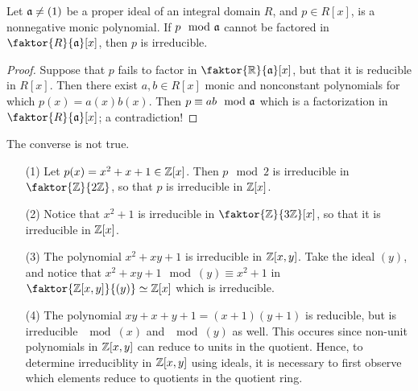 \begin{lemma}\label{lemma_7.3.3}
    Let $\mathfrak{a} \neq (1)$ be a proper ideal of an integral domain $R$, and  $p \in
    R[x]$, is a nonnegative monic polynomial. If $p \mod{\mathfrak{a}}$ cannot be factored
    in $\faktor{R}{\af}[x]$, then $p$ is irreducible.
\end{lemma}
\begin{proof}
    Suppose that $p$ fails to factor in  $\faktor{\R}{\af}[x]$, but that it is
    reducible in $R[x]$. Then there exist $a,b \in R[x]$ monic and nonconstant
    polynomials for which $p(x)=a(x)b(x)$. Then $p \equiv ab \mod{\mathfrak{a}}$ which is a
    factorization in $\faktor{R}{\af}[x]$; a contradiction!
\end{proof}
\begin{remark}
    The converse is not true.
\end{remark}

\begin{example}\label{example_7.5}
    \begin{enumerate}
        \item[(1)] Let $p(x)=x^2+x+1 \in \mathbb{Z}[x]$. Then $p \mod{2}$ is irreducible
            in $\faktor{\Z}{2\Z}$, so that $p$ is irreducible in  $\mathbb{Z}[x]$.

        \item[(2)] Notice that $x^2+1$ is irreducible in  $\faktor{\Z}{3\Z}[x]$,
            so that it is irreducible in $\mathbb{Z}[x]$.

        \item[(3)] The polynomial $x^2+xy+1$ is irreducible in  $\mathbb{Z}[x,y]$. Take
            the ideal $(y)$, and notice that $x^2+xy+1 \mod{(y)} \equiv x^2+1$
            in $\faktor{\Z[x,y]}{(y)} \simeq \Z[x]$ which is irreducible.

        \item[(4)] The polynomial $xy+x+y+1=(x+1)(y+1)$ is reducible, but is
            irreducible $\mod{(x)}$ and $\mod{(y)}$ as well. This occures since
            non-unit polynomials in $\mathbb{Z}[x,y]$ can reduce to units in the
            quotient. Hence, to determine irreduciblity in $\mathbb{Z}[x,y]$ using
            ideals, it is necessary to first observe which elements reduce to
            quotients in the quotient ring.
    \end{enumerate}
\end{example}

